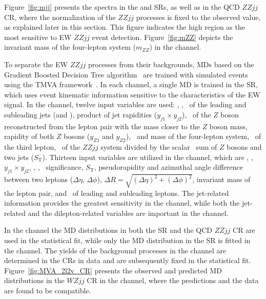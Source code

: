 
Figure~\ref{fig:mjj} presents the \mjj spectra in the \lllljj and \llvvjj SRs, as well as in the \lllljj QCD $ZZjj$ CR,
where the normalization of the $ZZjj$ processes is fixed to the observed value, as explained later in this section.
This figure
indicates the high \mjj region as the most sensitive to EW $ZZjj$ event detection.
Figure~\ref{fig:mZZ} depicts the invariant mass of the four-lepton system ($m_{ZZ}$) in the \lllljj channel.

To separate the EW $ZZjj$ processes from their backgrounds, MDs based on the Gradient Boosted Decision Tree algorithm~\cite{friedman2001} are trained with simulated events using the TMVA framework~\cite{Hocker:2007ht}. In each channel, a single MD is trained in the SR, which uses event kinematic information sensitive to the characteristics of the EW signal. In the \lllljj channel, twelve input variables are used: \mjj, \dyjj, \pt~of the leading and subleading jets (\ptleadj and \ptsubj), product of jet rapidities ($y_{j1}\times y_{j2}$), \pt~of the $Z$ boson reconstructed from the lepton pair with the mass closer to the $Z$ boson mass, rapidity of both $Z$ bosons ($y_{Z1}$ and $y_{Z2}$), \pt~and mass of the four-lepton system, \pt~of the third lepton, \pt~of the $ZZjj$ system divided by the scalar \pt~sum of $Z$ bosons and two jets ($S_{\mathrm{T}}$). Thirteen input variables are utilized in the \llvvjj channel, which are \mjj, \dyjj, $y_{j1}\times y_{j2}$, \ptsubj, \met, \met~significance, $S_{\mathrm{T}}$, pseudorapidity and azimuthal angle difference between two leptons ($\Delta\eta$, $\Delta\phi$), $\Delta R = \sqrt{(\Delta\eta)^2 + (\Delta\phi)^2}$, invariant mass of the lepton pair, and \pt~of leading and subleading leptons.
The jet-related information provides the greatest sensitivity in the \lllljj channel, while both the jet-related and the dilepton-related variables are important in the \llvvjj channel. 

In the \lllljj channel the MD distributions in both the SR and the QCD $ZZjj$ CR are used in the statistical fit,
while only the MD distribution in the SR is fitted in the \llvvjj channel.
The yields of the background processes in the \llvvjj channel are determined in the CRs in data and are subsequently fixed in the statistical fit.
Figure~\ref{fig:MVA_2l2v_CR} presents the observed and predicted MD distributions in the $WZjj$ CR in the \llvvjj channel, where the predictions and the data are found to be compatible. 

